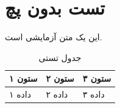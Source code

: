 \documentclass[12pt, a4paper]{article}
\begin{document}
\section{تست بدون پچ}
این یک متن آزمایشی است.

\begin{table}[htbp]
  \centering
  \caption{جدول تستی}
  \begin{tabular}{lll}
    \toprule
    ستون ۱ & ستون ۲ & ستون ۳ \\
    \midrule
    داده ۱ & داده ۲ & داده ۳ \\
    \bottomrule
  \end{tabular}
\end{table}
\end{document}
